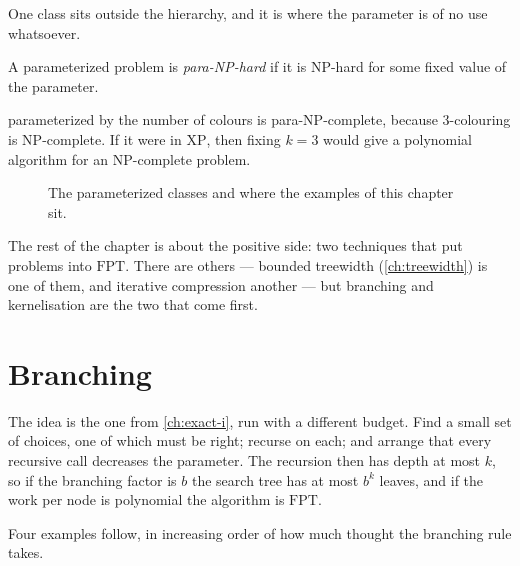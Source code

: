 One class sits outside the hierarchy, and it is where the parameter is of no use
whatsoever.

\begin{definition}[para-NP]\label{def:para-np}
A parameterized problem is \emph{para-NP-hard} if it is \textrm{NP}-hard for
some fixed value of the parameter.
\end{definition}

\begin{example}\label{ex:para-np-coloring}
 parameterized by the number of colours is
para-NP-complete, because $3$-colouring is \textrm{NP}-complete. If it were in
$\mathrm{XP}$, then fixing $k = 3$ would give a polynomial algorithm for an
\textrm{NP}-complete problem.
\end{example}

\begin{figure}[ht]
\centering
{}
\caption{The parameterized classes and where the examples of this chapter sit.}
\label{fig:fpt-classes}
\end{figure}

The rest of the chapter is about the positive side: two techniques that put
problems into $\mathrm{FPT}$. There are others --- bounded treewidth
(\cref{ch:treewidth}) is one of them, and iterative compression another --- but
branching and kernelisation are the two that come first.

\section{Branching}
\label{sec:fpt-branching}

The idea is the one from \cref{ch:exact-i}, run with a different budget. Find a
small set of choices, one of which must be right; recurse on each; and arrange
that every recursive call decreases the parameter. The recursion then has depth
at most $k$, so if the branching factor is $b$ the search tree has at most $b^k$
leaves, and if the work per node is polynomial the algorithm is $\mathrm{FPT}$.

Four examples follow, in increasing order of how much thought the branching rule
takes.

